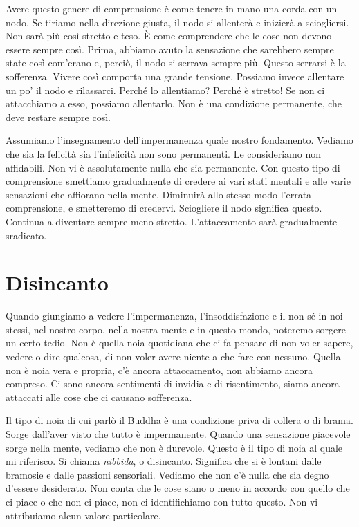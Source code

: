 Avere questo genere di comprensione è come tenere in mano una corda con
un nodo. Se tiriamo nella direzione giusta, il nodo si allenterà e
inizierà a sciogliersi. Non sarà più così stretto e teso. È come
comprendere che le cose non devono essere sempre così. Prima, abbiamo
avuto la sensazione che sarebbero sempre state così com'erano e, perciò,
il nodo si serrava sempre più. Questo serrarsi è la sofferenza. Vivere
così comporta una grande tensione. Possiamo invece allentare un po' il
nodo e rilassarci. Perché lo allentiamo? Perché è stretto! Se non ci
attacchiamo a esso, possiamo allentarlo. Non è una condizione
permanente, che deve restare sempre così.

\enlargethispage{-\baselineskip}

Assumiamo l'insegnamento dell'impermanenza quale nostro fondamento.
Vediamo che sia la felicità sia l'infelicità non sono permanenti. Le
consideriamo non affidabili. Non vi è assolutamente nulla che sia
permanente. Con questo tipo di comprensione smettiamo gradualmente di
credere ai vari stati mentali e alle varie sensazioni che affiorano
nella mente. Diminuirà allo stesso modo l'errata comprensione, e
smetteremo di credervi. Sciogliere il nodo significa questo. Continua a
diventare sempre meno stretto. L'attaccamento sarà gradualmente
sradicato.

\section{Disincanto}

Quando giungiamo a vedere l'impermanenza, l'insoddisfazione e il non-sé
in noi stessi, nel nostro corpo, nella nostra mente e in questo mondo,
noteremo sorgere un certo tedio. Non è quella noia quotidiana che ci fa
pensare di non voler sapere, vedere o dire qualcosa, di non voler avere
niente a che fare con nessuno. Quella non è noia vera e propria, c'è
ancora attaccamento, non abbiamo ancora compreso. Ci sono ancora
sentimenti di invidia e di risentimento, siamo ancora attaccati alle
cose che ci causano sofferenza.

Il tipo di noia di cui parlò il Buddha è una condizione priva di collera
o di brama. Sorge dall'aver visto che tutto è impermanente. Quando una
sensazione piacevole sorge nella mente, vediamo che non è durevole.
Questo è il tipo di noia al quale mi riferisco. Si chiama
\emph{nibbidā}, o disincanto. Significa che si è lontani dalle bramosie
e dalle passioni sensoriali. Vediamo che non c'è nulla che sia degno
d'essere desiderato. Non conta che le cose siano o meno in accordo con
quello che ci piace o che non ci piace, non ci identifichiamo con tutto
questo. Non vi attribuiamo alcun valore particolare.

